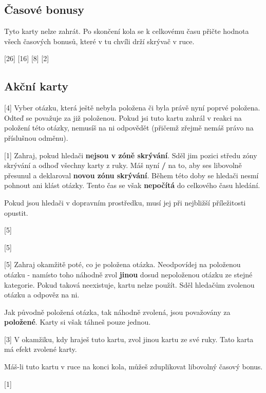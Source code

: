 

\subsection{Časové bonusy}

Tyto karty nelze zahrát. Po skončení kola se k celkovému času přičte hodnota všech časových bonusů, které v tu chvíli drží skrývač v ruce.

\begin{cards}
	[26]
	[16]
\end{cards}

\subsection{Akční karty}

\begin{cards}
	 Vyber otázku, která ještě nebyla položena či byla právě nyní poprvé položena. Odteď se považuje za již položenou. Pokud jsi tuto kartu zahrál v reakci na položení této otázky, nemusíš na ni odpovědět (přičemž zřejmě nemáš právo na příslušnou odměnu).

	 Zahraj, pokud hledači \textbf{nejsou v zóně skrývání}. Sděl jim pozici středu zóny skrývání a odhoď všechny karty z ruky. Máš nyní \textbf{\timehidingmove/} na to, aby ses libovolně přesunul a deklaroval \textbf{novou zónu skrývání}. Během této doby se hledači nesmí pohnout ani klást otázky. Tento čas se však \textbf{nepočítá} do celkového času hledání.

	Pokud jsou hledači v dopravním prostředku, musí jej při nejbližší příležitosti opustit.



	 Zahraj okamžitě poté, co je položena otázka. Neodpovídej na položenou otázku - namísto toho náhodně zvol \textbf{jinou} dosud nepoloženou otázku ze stejné kategorie. Pokud taková neexistuje, kartu nelze použít. Sděl hledačům zvolenou otázku a odpověz na ni.

	Jak původně položená otázka, tak náhodně zvolená, jsou považovány za \textbf{položené}. Karty si však táhneš pouze jednou.

	 V okamžiku, kdy hraješ tuto kartu, zvol jinou kartu ze své ruky. Tato karta má efekt zvolené karty.

	Máš-li tuto kartu v ruce na konci kola, můžeš zduplikovat libovolný časový bonus.

\end{cards}

